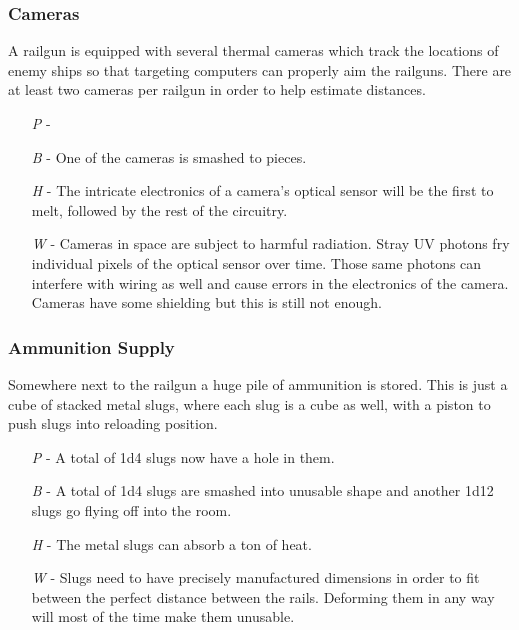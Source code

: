 \documentclass[a4paper]{article}
\begin{document}
\vspace{-0.5cm} \hspace{-18pt} \subsubsection{Cameras} \label{railgun_cameras} \vspace{-0.2cm}
A railgun is equipped with several thermal cameras which track the locations of enemy ships so that targeting computers can properly aim the railguns. There are at least two cameras per railgun in order to help estimate distances.
\begin{enumerate}
\item [\textit{P}] -  \\
\item [\textit{B}] - One of the cameras is smashed to pieces.
\item [\textit{H}] - The intricate electronics of a camera's optical sensor will be the first to melt, followed by the rest of the circuitry.
\item [\textit{W}] - Cameras in space are subject to harmful radiation. Stray UV photons fry individual pixels of the optical sensor over time. Those same photons can interfere with wiring as well and cause errors in the electronics of the camera. Cameras have some shielding but this is still not enough.
\end{enumerate}

\vspace{-0.5cm} \hspace{-18pt} \subsubsection{Ammunition Supply} \label{railgun_ammunition} \vspace{-0.2cm}
Somewhere next to the railgun a huge pile of ammunition is stored. This is just a cube of stacked metal slugs, where each slug is a cube as well, with a piston to push slugs into reloading position.
\begin{enumerate}
\item [\textit{P}] - A total of 1d4 slugs now have a hole in them.
\item [\textit{B}] - A total of 1d4 slugs are smashed into unusable shape and another 1d12 slugs go flying off into the room.
\item [\textit{H}] - The metal slugs can absorb a ton of heat.
\item [\textit{W}] - Slugs need to have precisely manufactured dimensions in order to fit between the perfect distance between the rails. Deforming them in any way will most of the time make them unusable.
\end{enumerate}
\end{document}

